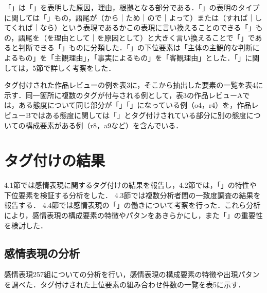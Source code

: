 \documentclass[japanese]{jnlp_1.3a}
\begin{document}
\begin{table}[t]

\end{table}

「」は「」を表明した原因，理由，根拠となる部分である．「」の表明のタイプに関しては「」もの，語尾が（から｜ため｜ので｜よって）または（すれば｜してくれば｜なら）という表現であるかこの表現に言い換えることのできる「」もの，語尾を（を理由として｜を原因として）と大きく言い換えることで「」であると判断できる「」ものに分類した．「」の下位要素は「主体の主観的な判断によるもの」を「主観理由」，「事実によるもの」を「客観理由」とした．「」に関しては，5節で詳しく考察をした．

タグ付けされた作品レビューの例を表3に，そこから抽出した要素の一覧を表4に示す．同一箇所に複数のタグが付与される例として，表3の作品レビューAでは，ある態度について同じ部分が「」「」になっている例（o4，r4）を，作品レビューBではある態度に関しては「」とタグ付けされている部分に別の態度についての構成要素がある例（r8，a9など）を含んでいる．

\begin{table}[t]

\end{table}

\section{タグ付けの結果}

4.1節では感情表現に関するタグ付けの結果を報告し，4.2節では，「」の特性や下位要素を検証する分析をした． 
4.3節では複数分析者間の一致度調査の結果を報告する． 
4.4節では感情表現の「」の働きについて考察を行った．これら分析により，感情表現の構成要素の特徴やパタンをあきらかにし，また「」の重要性を検討した．

\subsection{感情表現の分析}

感情表現257組についての分析を行い，感情表現の構成要素の特徴や出現パタンを調べた．タグ付けされた上位要素の組み合わせ件数の一覧を表5に示す．

\begin{table}[b]
\begin{center}

\end{center}
\end{table}
\end{document}
